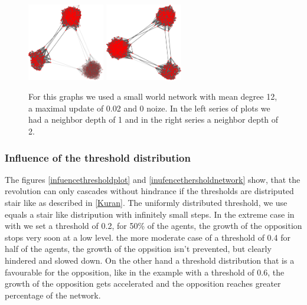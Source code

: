 \begin{figure}
\includegraphics[width=0.3\textwidth]{batchRun__kHalf=6-6-6_maxUpdate=0.02_noize=0_nbrDepth=1/network1000-crop.pdf}
\hskip2cm
\includegraphics[width=0.3\textwidth]{batchRun__kHalf=6-6-6_maxUpdate=0.02_noize=0_nbrDepth=2/network1000-crop.pdf}

\caption{For this graphs we used a small world network with mean degree 12, a maximal update of 0.02 and 0 noize. In the left series of plots we had a neighbor depth of 1 and in the right series a neighbor depth of 2.}
\label{influencenbrdepth}
\end{figure}

\subsubsection{Influence of the threshold distribution}
\label{sec:influencethresholddistribution}

The figures \ref{infuencethresholdplot} and \ref{inufencethersholdnetwork} show, that the revolution can only cascades without hindrance if the thresholds are distriputed stair like as described in \ref{Kuran}. The uniformly distributed threshold, we use equals a stair like distripution with infinitely small steps. In the extreme case in with we set a threshold of 0.2, for 50\% of the agents, the growth of the opposition stops very soon at a low level. the more moderate case of a threshold of 0.4 for half of the agents, the growth of the oppsition isn't prevented, but clearly hindered and slowed down.
On the other hand a threshold distribution that is a favourable for the opposition, like in the example with a threshold of 0.6, the growth of the opposition gets accelerated and the opposition reaches greater percentage of the network.  


